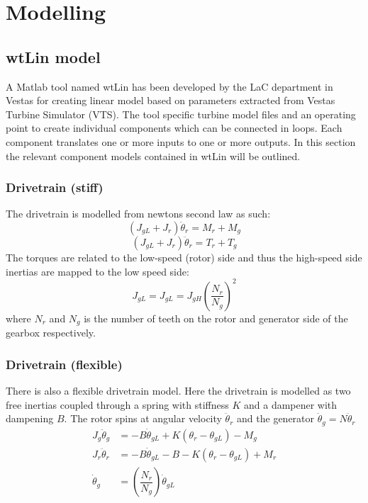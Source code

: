 \section{Modelling} \label{sec:mod} %

\subsection{wtLin model}
A Matlab tool named wtLin has been developed by the LaC department in Vestas for creating linear model based on parameters extracted from Vestas Turbine Simulator (VTS). The tool specific turbine model files and an operating point to create individual components which can be connected in loops. Each component translates one or more inputs to one or more outputs. In this section the relevant component models contained in wtLin will be outlined.\\

\subsubsection{Drivetrain (stiff)}
The drivetrain is modelled from newtons second law as such:
\begin{equation}\label{eq:wtlin_comp_drivetrain}
	(J_{gL} + J_{r}) \ddot{\theta}_r = M_{r} + M_{g}
\end{equation}
\begin{equation}\label{eq:wtlin_comp_drivetrain}
	(J_{gL} + J_{r}) \ddot{\theta}_r = T_{r} + T_{g}
\end{equation}
The torques are related to the low-speed (rotor) side and thus the high-speed side inertias are mapped to the low speed side:
\begin{equation} \label{eq:wtlin_comp_inertiamap}
	J_{gL} = J_{gL} = J_{gH} \left(\dfrac{N_r}{N_g}\right)^2
\end{equation}
where $ N_r $ and $ N_g $ is the number of teeth on the rotor and generator side of the gearbox respectively.


\subsubsection{Drivetrain (flexible)}
There is also a flexible drivetrain model. Here the drivetrain is modelled as two free inertias coupled through a spring with stiffness $ K $ and a dampener with dampening $ B $. The rotor spins at angular velocity $ \ddot{\theta}_r $ and the generator $ \ddot{\theta}_g = N \ddot{\theta}_r $
\begin{align} \label{eq:wtlin_comp_drivetrain_flex}
	J_{g} \ddot{\theta}_g & = -B \dot{\theta}_{gL} + K(\theta_r - \theta_{gL}) - M_{g} \\
	J_{r} \ddot{\theta}_r & = -B \dot{\theta}_{gL} -B - K(\theta_r - \theta_{gL}) + M_{r} \\
	\dot{\theta}_g & = \left(\dfrac{N_r}{N_g}\right) \dot{\theta}_{gL}
\end{align}












%	

